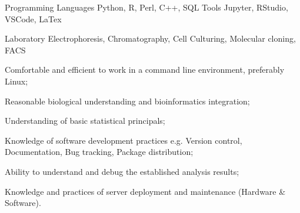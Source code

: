 

\begin{cventries}

\begin{cvskills}
  \cvskill
    {Programming Languages} %
    {Python, R, Perl, C++, SQL} %
  \cvskill
    {Tools} %
    {Jupyter, RStudio, VSCode, LaTex} %
    
  \cvskill
    {Laboratory}
    {Electrophoresis, Chromatography, Cell Culturing, Molecular cloning, FACS}
\end{cvskills}
\vspace{1em}
\begin{cvitems}
    \item{Comfortable and efficient to work in a command line environment, preferably Linux;}
    \item{Reasonable biological understanding and bioinformatics integration;}
    \item{Understanding of basic statistical principals;}
    \item{Knowledge of software development practices e.g. Version control, Documentation, Bug tracking, Package distribution;}
    \item{Ability to understand and debug the established analysis results;}
    \item{Knowledge and practices of server deployment and maintenance (Hardware & Software).}
    
\end{cvitems}
\end{cventries}